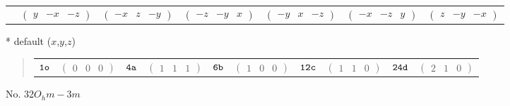 \documentclass[fleqn,9pt,landscape]{jsarticle}
\begin{document}
\begin{center}
\begin{longtable}{ccccccc}
& $ \begin{pmatrix} y & - x & - z \end{pmatrix} $ & $ \begin{pmatrix} - x & z & - y \end{pmatrix} $ & $ \begin{pmatrix} - z & - y & x \end{pmatrix} $ & $ \begin{pmatrix} - y & x & - z \end{pmatrix} $ & $ \begin{pmatrix} - x & - z & y \end{pmatrix} $ & $ \begin{pmatrix} z & - y & - x \end{pmatrix} $ \\
\end{longtable}
\end{center}
* default ($x$,$y$,$z$)
\begin{quote}
\begin{tabular}{cccccccccc}
$ {\tt 1o} $ & $ \begin{pmatrix} 0 & 0 & 0 \end{pmatrix} $ & $ {\tt 4a} $ & $ \begin{pmatrix} 1 & 1 & 1 \end{pmatrix} $ & $ {\tt 6b} $ & $ \begin{pmatrix} 1 & 0 & 0 \end{pmatrix} $ & $ {\tt 12c} $ & $ \begin{pmatrix} 1 & 1 & 0 \end{pmatrix} $ & $ {\tt 24d} $ & $ \begin{pmatrix} 2 & 1 & 0 \end{pmatrix} $
\end{tabular}
\end{quote}
\newpage
No. 32\quad$O_{h}$\quad$m-3m$\quad[ cubic ]
\end{document}
